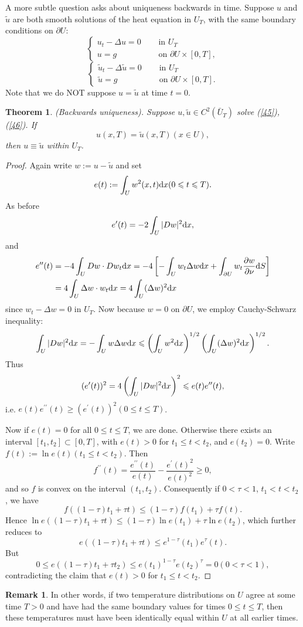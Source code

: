 \documentclass[hyperref,UTF8,12pt]{article}
\numberwithin{equation}{subsection}
\theoremstyle{plain}
\newtheorem{theorem}{Theorem}
\theoremstyle{definition}
\newtheorem{remark}{Remark}
\numberwithin{theorem}{section}
\numberwithin{lemma}{section}
\numberwithin{proposition}{section}
\numberwithin{remark}{section}
\numberwithin{corollary}{section}
\numberwithin{definition}{section}
\numberwithin{problem}{section}
\numberwithin{example}{section}
\def\dif{\textup{d}}
\newcommand{\ptl}{\partial}
\renewcommand{\leq}{\leqslant}
\renewcommand{\geq}{\geqslant}
\begin{document}
A more subtle question asks about uniqueness backwards in time. Suppose $u$ and $\tilde{u}$ are both smooth solutions of the heat equation in $U_T$, with the same boundary conditions on $\ptl U$:\[\tag{45}\label{45}\left\{\begin{aligned}
	u_t-\Delta u=0&\quad\text{ in } U_T\\
	u=g&\quad\text{ on } \ptl U \times[0,T],
\end{aligned}\right.\]\[\tag{46}\label{46}\left\{\begin{aligned}
\tilde{u}_t-\Delta\tilde{u}=0&\quad\text{ in } U_T\\
\tilde{u}=g&\quad\text{ on } \ptl U \times[0,T].
\end{aligned}\right.\]Note that we do NOT suppose $u=\tilde{u}$ at time $t=0$.
\begin{theorem}
(Backwards uniqueness). Suppose $u,\tilde{u}\in C^2(\bar{U}_T)$ solve (\ref{45}), (\ref{46}). If\[u(x,T)=\tilde{u}(x,T)(x\in U),\] then $u\equiv\tilde{u}$ within $U_T$.
\end{theorem}
\begin{proof}
Again write $w:=u-\tilde{u}$ and set\[e(t):=\int_Uw^2(x,t)\dif x(0\leq t\leq T).\]As before \[e^\prime(t)=-2\int_U|Dw|^2\dif x,\]and\[\begin{aligned}
	e^{\prime\prime}(t)&=-4\int_UDw\cdot Dw_t\dif x=-4\left[-\int_Uw_t\Delta w\dif x+\int_{\ptl U}w_t\frac{\ptl w}{\ptl\nu}\dif S\right]\\
	&=4\int_U\Delta w\cdot w_t\dif x=4\int_U(\Delta w)^2\dif x
\end{aligned}\]since $w_t-\Delta w=0$ in $U_T$. Now because $w=0$ on $\ptl U$, we employ Cauchy-Schwarz inequality:\[\int_U|Dw|^2\dif x=-\int_Uw\Delta w\dif x
\leq\left(\int_Uw^2\dif x\right)^{1/2}\left(\int_U(\Delta w)^2\dif x\right)^{1/2}.\]Thus \[(e^\prime(t))^2=4\left(\int_U|Dw|^2\dif x\right)^2\leq e(t)e^{\prime\prime}(t),\]i.e. $e(t)e^{\prime\prime}(t)\geq(e^\prime(t))^2(0\leq t\leq T)$.

Now if $e(t)=0$ for all $0\leq t\leq T$, we are done. Otherwise there exists an interval $[t_1,t_2]\subset[0,T]$, with $e(t)>0$ for $t_1\leq t<t_2$, and $e(t_2)=0$. Write $f(t):=\ln e(t)(t_1\leq t<t_2)$. Then\[f^{\prime\prime}(t)=\frac{e^{\prime\prime}(t)}
{e(t)}-\frac{e^\prime(t)^2}{e(t)^2}\geq0,\]and so $f$ is convex on the interval $(t_1,t_2)$. Consequently if $0<\tau<1$, $t_1<t<t_2$, we have
\[f((1-\tau)t_1+\tau t)\leq(1-\tau)f(t_1)+\tau f(t).\]Hence $\ln e((1-\tau)t_1+\tau t)\leq (1-\tau)\ln e(t_1)+\tau\ln e(t_2)$, which further reduces to\[e((1-\tau)t_1+\tau t)\leq e^{1-\tau}(t_1)e^\tau(t).\]But\[0\leq e((1-\tau)t_1+\tau t_2)\leq e(t_1)^{1-\tau} e(t_2)^\tau=0(0<\tau<1),\]contradicting the claim that $e(t)>0$ for $t_1\leq t<t_2$.
\end{proof}
\begin{remark}
In other words, if two temperature distributions on $U$ agree at some time $T>0$ and have had the same boundary values for times $0\leq t\leq T$, then these temperatures must have been identically equal within $U$ at all earlier times.
\end{remark}
\end{document}
